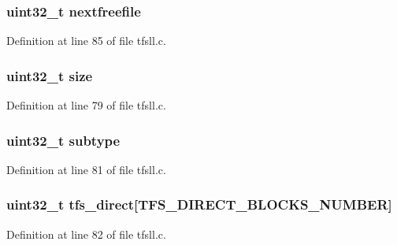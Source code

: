 \subsubsection[{nextfreefile}]{\setlength{\rightskip}{0pt plus 5cm}uint32\+\_\+t nextfreefile}\label{structtfs__ftent_ae22ee9d0bca474f92a2bb927af36f070}


Definition at line 85 of file tfsll.\+c.

\hypertarget{structtfs__ftent_ab2c6b258f02add8fdf4cfc7c371dd772}{}
\subsubsection[{size}]{\setlength{\rightskip}{0pt plus 5cm}uint32\+\_\+t size}\label{structtfs__ftent_ab2c6b258f02add8fdf4cfc7c371dd772}


Definition at line 79 of file tfsll.\+c.

\hypertarget{structtfs__ftent_aed06f4a516930ca81d204d53c61a1ef3}{}
\subsubsection[{subtype}]{\setlength{\rightskip}{0pt plus 5cm}uint32\+\_\+t subtype}\label{structtfs__ftent_aed06f4a516930ca81d204d53c61a1ef3}


Definition at line 81 of file tfsll.\+c.

\hypertarget{structtfs__ftent_ac72173305c111f1c618d565e1fcf465d}{}
\subsubsection[{tfs\+\_\+direct}]{\setlength{\rightskip}{0pt plus 5cm}uint32\+\_\+t tfs\+\_\+direct\mbox{[}{\bf T\+F\+S\+\_\+\+D\+I\+R\+E\+C\+T\+\_\+\+B\+L\+O\+C\+K\+S\+\_\+\+N\+U\+M\+B\+E\+R}\mbox{]}}\label{structtfs__ftent_ac72173305c111f1c618d565e1fcf465d}


Definition at line 82 of file tfsll.\+c.

\hypertarget{structtfs__ftent_acf7d5c649c8c0f9cec2a1ed197b3ff4c}{}
